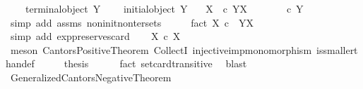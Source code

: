 \begin{isabellebody}
\ \ \ {\isachardoublequoteopen}{\isasymnot}\ terminal{\isacharunderscore}{\kern0pt}object\ Y{\isachardoublequoteclose}\isanewline
\ \ \ {\isachardoublequoteopen}{\isasymnot}\ initial{\isacharunderscore}{\kern0pt}object\ Y{\isachardoublequoteclose}\isanewline
\ \ \ {\isachardoublequoteopen}X\ \ {\isasymle}\isactrlsub c\ Y\isactrlbsup X\isactrlesup {\isachardoublequoteclose}\isanewline
%
\isadelimproof
%
\endisadelimproof
%
\isatagproof
{}\isamarkupfalse%
\ {\isacharminus}{\kern0pt}\ \isanewline
\ \ \isamarkupfalse%
\ {\isachardoublequoteopen}{\isasymOmega}\ {\isasymle}\isactrlsub c\ Y{\isachardoublequoteclose}\isanewline
\ \ \ \ \isamarkupfalse%
\ {\isacharparenleft}{\kern0pt}simp\ add{\isacharcolon}{\kern0pt}\ assms\ non{\isacharunderscore}{\kern0pt}init{\isacharunderscore}{\kern0pt}non{\isacharunderscore}{\kern0pt}ter{\isacharunderscore}{\kern0pt}sets{\isacharparenright}{\kern0pt}\isanewline
\ \ \isamarkupfalse%
\ \isamarkupfalse%
\ fact{\isacharcolon}{\kern0pt}\ {\isachardoublequoteopen}{\isasymOmega}\isactrlbsup X\isactrlesup \ {\isasymle}\isactrlsub c\ \ Y\isactrlbsup X\isactrlesup {\isachardoublequoteclose}\isanewline
\ \ \ \ \isamarkupfalse%
\ {\isacharparenleft}{\kern0pt}simp\ add{\isacharcolon}{\kern0pt}\ exp{\isacharunderscore}{\kern0pt}preserves{\isacharunderscore}{\kern0pt}card{}{\isacharparenright}{\kern0pt}\isanewline
\ \ \isamarkupfalse%
\ {\isachardoublequoteopen}X\ {\isasymle}\isactrlsub c\ {\isasymOmega}\isactrlbsup X\isactrlesup {\isachardoublequoteclose}\isanewline
\ \ \ \ \isamarkupfalse%
\ {\isacharparenleft}{\kern0pt}meson\ Cantors{\isacharunderscore}{\kern0pt}Positive{\isacharunderscore}{\kern0pt}Theorem\ CollectI\ injective{\isacharunderscore}{\kern0pt}imp{\isacharunderscore}{\kern0pt}monomorphism\ is{\isacharunderscore}{\kern0pt}smaller{\isacharunderscore}{\kern0pt}than{\isacharunderscore}{\kern0pt}def{\isacharparenright}{\kern0pt}\isanewline
\ \ \isamarkupfalse%
\ \isamarkupfalse%
\ {\isacharquery}{\kern0pt}thesis\isanewline
\ \ \ \ \isamarkupfalse%
\ fact\ set{\isacharunderscore}{\kern0pt}card{\isacharunderscore}{\kern0pt}transitive\ \isamarkupfalse%
\ blast\isanewline
{}\isamarkupfalse%
%
\endisatagproof
{\isafoldproof}%
%
\isadelimproof
\isanewline
%
\endisadelimproof
\isanewline
{}\isamarkupfalse%
\ Generalized{\isacharunderscore}{\kern0pt}Cantors{\isacharunderscore}{\kern0pt}Negative{\isacharunderscore}{\kern0pt}Theorem{\isacharcolon}{\kern0pt}\isanewline

\end{isabellebody}
